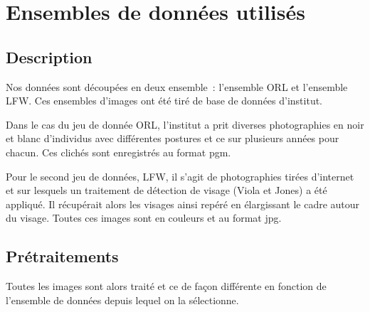 \documentclass[a4paper,10pt,twocolumn]{extarticle}
\begin{document}
\section{Ensembles de données utilisés}
\subsection{Description}
Nos données sont découpées en deux ensemble : l'ensemble ORL et l'ensemble LFW.  Ces ensembles d'images ont été tiré de base de données d'institut.

Dans le cas du jeu de donnée ORL, l'institut a prit diverses photographies en noir et blanc d’individus avec différentes postures et ce sur plusieurs années pour chacun. Ces clichés sont enregistrés au format pgm.

Pour le second jeu de données, LFW, il s'agit de photographies tirées d'internet et sur lesquels un traitement de détection de visage (Viola et Jones) a été appliqué. Il récupérait alors les visages ainsi repéré en élargissant le cadre autour du visage. Toutes ces images sont en couleurs et au format jpg.

\subsection{Prétraitements}
Toutes les images sont alors traité et ce de façon différente en fonction de l'ensemble de données depuis lequel on la sélectionne. 
\end{document}
